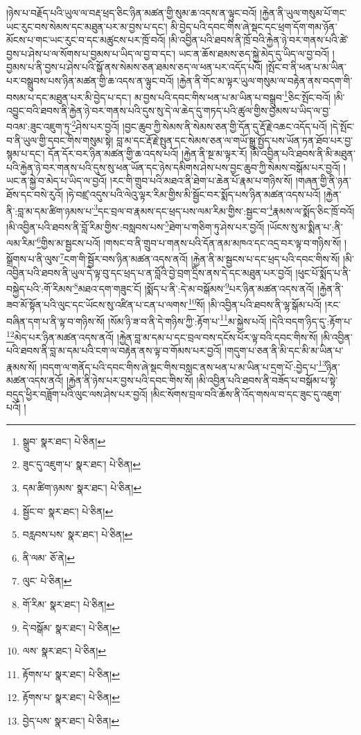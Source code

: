 །ཉེས་པ་བརྗོད་པའི་ཡུལ་ལ་བརྡ་ཕྲད་ཅིང་ཉིན་མཚན་གྱི་སུམ་ཆ་འདས་ན་ལྟུང་བའོ། །རྐྱེན་ནི་ཡུལ་གསུམ་པོ་གང་ཡང་རུང་བས་སེམས་དང་མཐུན་པར་མ་བྱས་པ་དང་། མི་བྱེད་པའི་དབང་གིས་ཞེ་སྡང་དང་ཕྲག་དོག་གམ་ཉོན་མོངས་པ་གང་ཡང་རུང་བ་དང་མཚུངས་པར་ཁྲོ་བའོ། །མི་འབྱིན་པའི་ཐབས་ནི་ཁྲོ་བའི་རྐྱེན་ཉེ་བར་གནས་པའི་ཚེ་བྱས་པ་ཤེས་པ་ལ་སོགས་པ་བྱམས་པ་ཡིད་ལ་བྱ་བ་དང་། ཡང་ན་ཆོས་ཐམས་ཅད་སྐྱེ་མེད་དུ་ཡིད་ལ་བྱ་བའོ། །བྱམས་པ་ནི་བྱས་པ་ཤེས་པའི་སྒོ་ནས་སེམས་ཅན་ཐམས་ཅད་ལ་ཕན་པར་འདོད་པའོ། །སྤོང་བ་ནི་ཕན་པ་མ་ཡིན་པར་བསྒྲུབས་པས་ཉིན་མཚན་གྱི་ཆ་འདས་ན་ལྟུང་བའོ། །རྐྱེན་ནི་གོང་མ་ལྟར་ཡུལ་གསུམ་ལ་བརྟེན་ནས་བདག་གི་བསམ་པ་དང་མཐུན་པར་མི་བྱེད་པ་དང་། མ་བྱས་པའི་དབང་གིས་ཕན་པ་མ་ཡིན་པ་བསྒྲུབ་\footnote{སྒྲུབ་  སྣར་ཐང་།  པེ་ཅིན། }ཅིང་སྤོང་བའོ། །མི་འབྱུང་བའི་ཐབས་ནི་རྐྱེན་ཉེ་བར་གནས་པའི་དུས་སུ་དེ་ལ་ཆེད་དུ་གཏད་པའི་ཚུལ་གྱིས་བྱམས་པ་ཡིད་ལ་བྱ་བའམ་:ཟུང་འཇུག་ཏུ་\footnote{ཟུང་དུ་འཇུག་པ་  སྣར་ཐང་།  པེ་ཅིན། }ཤེས་པར་བྱའོ། །བྱང་ཆུབ་ཀྱི་སེམས་ནི་སེམས་ཅན་གྱི་དོན་དུ་རྡོ་རྗེ་འཆང་འདོད་པའོ། །དེ་སྤོང་བ་ནི་ཡུལ་གྱི་དབང་གིས་གསུམ་སྟེ། བླ་མ་དང་རྡོ་རྗེ་སྤུན་དང་སེམས་ཅན་ལ་གཡོ་སྒྱུ་སྤྱོད་པས་ཡོན་ཏན་ཐོབ་པར་བྱ་སྙམ་པ་དང་། དོན་དོར་བར་ཉིན་མཚན་གྱི་ཆ་འདས་པའོ། །རྐྱེན་ནི་སྔ་མ་ལྟར་རོ། །མི་འབྱིན་པའི་ཐབས་ནི་མི་མཐུན་པའི་རྐྱེན་ཉེ་བར་གནས་པའི་དུས་སུ་ཕན་ཡོན་དང་ཉེས་དམིགས་ཤེས་པས་བྱང་ཆུབ་ཀྱི་སེམས་བསྒོམ་པར་བྱའོ། །ཡང་ན་སྐྱེ་བ་མེད་པ་ཡིད་ལ་བྱའོ། །རང་གི་གྲུབ་པའི་མཐའ་ནི་ཐེག་པ་ཆེན་པོ་རྣམ་པ་གཉིས་སོ། །གཞན་གྱི་ནི་ཉན་ཐོས་དང་བསེ་རུའོ། །ཧེ་བཛྲ་འདུས་པའི་ལེའུ་ལྟར་རིམ་གྱིས་མི་སྦྱོང་བར་སྨོད་པས་ཉིན་མཚན་འདས་པའོ། །རྐྱེན་ནི་:བླ་མ་དམ་ཚིག་ཉམས་པ་\footnote{དམ་ཚིག་ཉམས་  སྣར་ཐང་།  པེ་ཅིན། }དང་བྲལ་བ་རྣམས་དང་ཕྲད་པས་ལམ་རིམ་གྱིས་:སྦྱང་བ་\footnote{སྦྱོང་བ་  སྣར་ཐང་།  པེ་ཅིན། }རྣམས་ལ་སྨོད་ཅིང་ཁྲོ་བའོ། །མི་འབྱིན་པའི་ཐབས་ནི་བློ་རིམ་གྱིས་:བསླབས་པས་\footnote{བརླབས་པས་  སྣར་ཐང་།  པེ་ཅིན། }ཐེག་པ་གཅིག་ཏུ་ཤེས་པར་བྱའོ། །ཡོངས་སུ་མ་སྨིན་པ་:ནི་ལམ་རིམ་\footnote{ནི་ལམ་  ཅོ་ནེ། }གྱིས་མ་སྦྱངས་པའོ། །གསང་བ་ནི་གྲུབ་པ་གནས་པའི་དོན་ནམ་མཁའ་དང་འདྲ་བར་ལྟ་བ་གཉིས་སོ། །སྒྲོགས་པ་ནི་ལུས་\footnote{ལུང་  པེ་ཅིན། }ངག་གི་སྦྱོར་བས་ཉིན་མཚན་འདས་ནའོ། །རྐྱེན་ནི་མ་སྦྱངས་པ་དང་ཕྲད་པའི་དབང་གིས་སོ། །མི་འབྱིན་པའི་ཐབས་ནི་ཡུལ་དེ་ལྟ་བུ་དང་ཕྲད་པ་ན་བློའི་བྱེ་བྲག་དྲིས་ནས་དེ་དང་མཐུན་པར་བྱའོ། །ཕུང་པོ་སྨོད་པ་ནི་བསྐྱེད་པའི་:གོ་རིམས་\footnote{གོ་རིམ་  སྣར་ཐང་།  པེ་ཅིན། }མཐའ་དག་གཟུང་ངོ། །སྨོད་པ་ནི་:དེ་མ་བསྒོམས་\footnote{དེ་བསྒོམ་  སྣར་ཐང་།  པེ་ཅིན། }པར་ཉིན་མཚན་འདས་ནའོ། །རྐྱེན་ནི་ཟབ་མོ་སྟོན་པའི་ལུང་དང་ཡོངས་སུ་འཛིན་པ་ངན་པ་ལགས་\footnote{ལས་  སྣར་ཐང་།  པེ་ཅིན། }སོ། །མི་འབྱིན་པའི་ཐབས་ནི་ལྷ་སྒོམ་པའོ། །རང་བཞིན་དག་པ་ནི་ལྟ་བ་གཉིས་སོ། །སོམ་ཉི་ཟ་བ་ནི་དེ་གཉིས་ཀྱི་:རྟོག་པ་\footnote{རྟོགས་པ་  སྣར་ཐང་།  པེ་ཅིན། }མ་སྐྱེས་པའོ། །དེའི་བདག་ཉིད་དུ་:རྟོག་པ་\footnote{རྟོགས་པ་  སྣར་ཐང་།  པེ་ཅིན། }མེད་པར་ཉིན་མཚན་འདས་ནའོ། །རྐྱེན་བླ་མ་དམ་པ་དང་བྲལ་བས་དངོས་པོར་ལྟ་བའི་དབང་གིས་སོ། །མི་འབྱིན་པའི་ཐབས་ནི་བླ་མ་དམ་པའི་ངག་ལ་བརྟེན་ནས་ལྟ་བ་གོམས་པར་བྱའོ། །གདུག་པ་ཅན་ནི་མི་དང་མི་མ་ཡིན་པ་རྣམས་སོ། །བདག་ལ་གནོད་པའི་དབང་གིས་ཞེ་སྡང་གིས་བསླང་ནས་ཕན་པ་མ་ཡིན་པ་དྲག་པོ་:བྱེད་པ་\footnote{བྱེད་པས་  སྣར་ཐང་།  པེ་ཅིན། }ཉིན་མཚན་འདས་ནའོ། །རྐྱེན་ནི་ཉེས་པར་བྱས་པའི་དབང་གིས་སོ། །མི་འབྱིན་པའི་ཐབས་ནི་བཟོད་པ་བསྒོམ་པ་སྟེ་བདུད་ཕྱིར་བཟློག་པའི་ལུང་ལས་ཤེས་པར་བྱའོ། །མིང་སོགས་བྲལ་བའི་ཆོས་ནི་འོད་གསལ་བ་དང་ཟུང་དུ་འཇུག་པའོ། །
